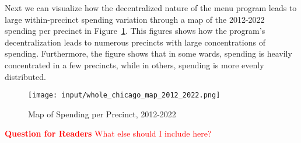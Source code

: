 Next we can visualize how the decentralized nature of the menu program leads to large within-precinct spending variation through a map of the 2012-2022 spending per precinct in Figure~\ref{fig:spending_map}.
This figures shows how the program's decentralization leads to numerous precincts with large concentrations of spending.
Furthermore, the figure shows that in some wards, spending is heavily concentrated in a few precincts, while in others, spending is more evenly distributed.

\begin{figure}[H]
    \centering
    \texttt{[image: input/whole\_chicago\_map\_2012\_2022.png]}
    \caption{Map of Spending per Precinct, 2012-2022}
    \label{fig:spending_map}
\end{figure}

\textcolor{red}{\textbf{Question for Readers} What else should I include here?}


